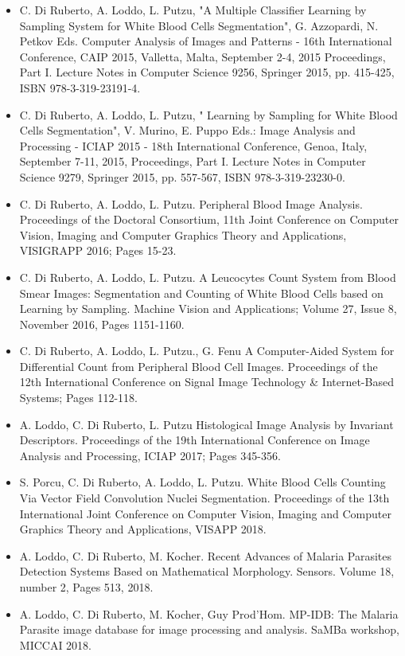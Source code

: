 \documentclass[final,a4paper,12pt,english]{UnicaPhdThesis3}
\begin{document}
\begin{itemize}
\item C. Di Ruberto, A. Loddo, L. Putzu, "A Multiple Classifier Learning by Sampling System for White Blood Cells Segmentation", G. Azzopardi, N. Petkov Eds. Computer Analysis of Images and Patterns - 16th International Conference, CAIP 2015, Valletta, Malta, September 2-4, 2015 Proceedings, Part I. Lecture Notes in Computer Science 9256, Springer 2015, pp. 415-425, ISBN 978-3-319-23191-4.
\item C. Di Ruberto, A. Loddo, L. Putzu, " Learning by Sampling for White Blood Cells Segmentation", V. Murino, E. Puppo Eds.: Image Analysis and Processing - ICIAP 2015 - 18th International Conference, Genoa, Italy, September 7-11, 2015, Proceedings, Part I. Lecture Notes in Computer Science 9279, Springer 2015, pp. 557-567,  ISBN 978-3-319-23230-0. 
\item C. Di Ruberto, A. Loddo, L. Putzu. Peripheral Blood Image Analysis. Proceedings of the Doctoral Consortium, 11th Joint Conference on Computer Vision, Imaging and Computer Graphics Theory and Applications, VISIGRAPP 2016; Pages 15-23.
\item C. Di Ruberto, A. Loddo, L. Putzu. A Leucocytes Count System from Blood Smear Images: Segmentation and Counting of White Blood Cells based on Learning by Sampling. Machine Vision and Applications; Volume 27, Issue 8, November 2016, Pages 1151-1160.
\item C. Di Ruberto, A. Loddo, L. Putzu., G. Fenu A Computer-Aided System for Differential Count from Peripheral Blood Cell Images. Proceedings of the 12th International Conference on Signal Image Technology \& Internet-Based Systems; Pages 112-118.
\item A. Loddo, C. Di Ruberto, L. Putzu Histological Image Analysis by Invariant Descriptors. Proceedings of the 19th International Conference on Image Analysis and Processing, ICIAP 2017; Pages 345-356.
\item S. Porcu, C. Di Ruberto, A. Loddo, L. Putzu. White Blood Cells Counting Via Vector Field Convolution Nuclei Segmentation. Proceedings of the 13th International Joint Conference on Computer Vision, Imaging and Computer Graphics Theory and Applications, VISAPP 2018.
\item A. Loddo, C. Di Ruberto, M. Kocher. Recent Advances of Malaria Parasites Detection Systems Based on Mathematical Morphology. Sensors. Volume 18, number 2, Pages 513, 2018.
\item A. Loddo, C. Di Ruberto, M. Kocher, Guy Prod'Hom. MP-IDB: The Malaria Parasite image database for image processing and analysis. SaMBa workshop, MICCAI 2018.
\end{itemize}
\end{document}
